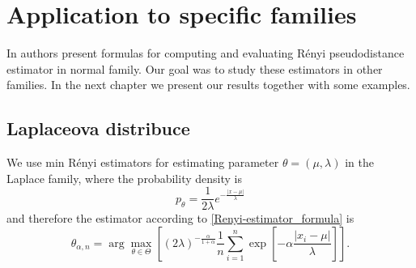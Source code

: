 
\chapter{Application to specific families}

In \cite{Vajda2009} authors present formulas for computing and evaluating R\'{e}nyi pseudodistance estimator in normal family. Our goal was to study these estimators in other families. In the next chapter we present our results together with some examples.

\section{Laplaceova distribuce}


We use min R\'{e}nyi estimators for estimating parameter $\theta = (\mu,\lambda)$ in the Laplace family, where the probability density is 
\begin{equation}
	p_\theta = \frac{1}{2\lambda} e^{-\frac{|x-\mu|}{\lambda}}
\end{equation}
and therefore the estimator according to \eqref{Renyi-estimator_formula} is 
\begin{equation}
	\theta_{\alpha,n} = \arg \max_{\theta \in \Theta} \left[ (2\lambda)^{-\frac{\alpha}{1+\alpha}} \frac{1}{n} \sum_{i=1}^n \exp \left[-\alpha\frac{|x_i-\mu|}{\lambda} \right] \right].
\end{equation}

